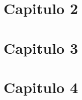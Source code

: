 \documentclass[12pt, twoside]{book}
\theoremstyle{definition}
\begin{document}
\chapter{Capitulo 2}


\chapter{Capitulo 3}


\chapter{Capitulo 4}




\end{document}
